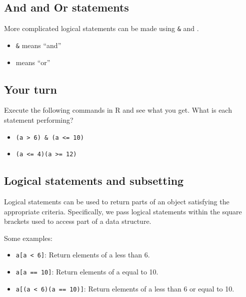 \documentclass[
]{article}
\providecommand{\tightlist}{%
  \setlength{\itemsep}{0pt}\setlength{\parskip}{0pt}}
\begin{document}
\hypertarget{and-and-or-statements}{%
\subsection{And and Or statements}\label{and-and-or-statements}}

More complicated logical statements can be made using \texttt{\&} and
\texttt{\textbar{}}.

\begin{itemize}
\tightlist
\item
  \texttt{\&} means ``and''
\item
  \texttt{\textbar{}} means ``or''
\end{itemize}

\hypertarget{your-turn-12}{%
\subsection{Your turn}\label{your-turn-12}}

Execute the following commands in R and see what you get. What is each
statement performing?

\begin{itemize}
\tightlist
\item
  \texttt{(a\ \textgreater{}\ 6)\ \&\ (a\ \textless{}=\ 10)}
\item
  \texttt{(a\ \textless{}=\ 4)\textbar{}(a\ \textgreater{}=\ 12)}
\end{itemize}

\hypertarget{logical-statements-and-subsetting}{%
\subsection{Logical statements and
subsetting}\label{logical-statements-and-subsetting}}

Logical statements can be used to return parts of an object satisfying
the appropriate criteria. Specifically, we pass logical statements
within the square brackets used to access part of a data structure.

Some examples:

\begin{itemize}
\tightlist
\item
  \texttt{a{[}a\ \textless{}\ 6{]}}: Return elements of a less than 6.
\item
  \texttt{a{[}a\ ==\ 10{]}}: Return elements of a equal to 10.
\item
  \texttt{a{[}(a\ \textless{}\ 6)\textbar{}(a\ ==\ 10){]}}: Return
  elements of a less than 6 or equal to 10.
\end{itemize}
\end{document}
